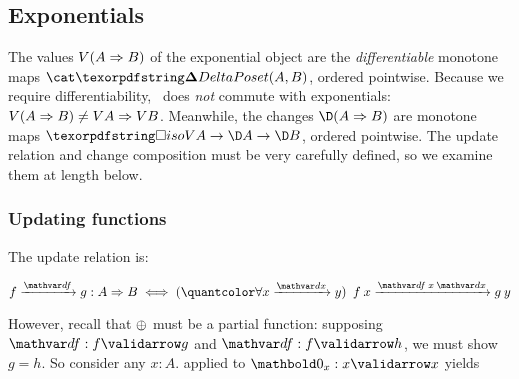 



\subsection{Exponentials}
\label{sec:CP-exponentials}

The values $V{(A \Rightarrow B)}$ of the exponential object are the
\emph{differentiable} monotone maps $\CP(A, B)$, ordered pointwise. Because we
require differentiability, \valfn\ does \emph{not} commute with exponentials:
$V{(A \Rightarrow B)} \ne V A \Rightarrow V B$.
%
Meanwhile, the changes $\chgs{(\expO A B)}$ are monotone maps $\isof{\vals A}
\to \chgs A \to \chgs B$, ordered pointwise. The update relation and change
composition must be very carefully defined, so we examine them at length below.

\subsubsection{Updating functions}

The update relation is:

\nopagebreak[2]
\begin{equation}\label{eqn:function-update}
  \vld{\df}{f}{g} : \expO A B
  \iff \fa{\vld\dx x y} \vld{\df\<x\<\dx} {f\<x} {g\<y}
\end{equation}

\noindent However, recall that $\mathbin{\oplus}$ must be a partial function: supposing
$\valid\df f g$ and $\valid\df f h$, we must show $g = h$. So consider any $x :
A$.  applied to $\valid{\zero_x} x x$ yields

